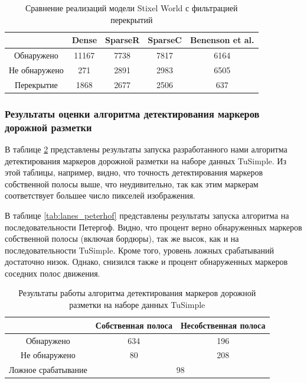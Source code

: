 \documentclass[aps,%
14pt,%
final,%
oneside,
onecolumn,%
musixtex, %
superscriptaddress,%
centertags]{extarticle} %
\begin{document}
\begin{table}
\center
\begin{tabular}{|c|c|c|c|c|}
\hline
						 & Dense & SparseR & SparseC & Benenson et al. \\
\hline
	Обнаружено 			& 11167 & 7738 & 7817 & 6164\\
\hline
	Не обнаружено 		& 271   & 2891 & 2983 & 6505\\
\hline
	Перекрытие			& 1868  & 2677 & 2506 & 637\\
\hline
\end{tabular}
\caption{Сравнение реализаций модели Stixel World с фильтрацией перекрытий}
\label{tab:filter_occ}
\end{table}

\subsubsection{Результаты оценки алгоритма детектирования маркеров дорожной разметки}

В таблице \ref{tab:lanes_tusimple} представлены результаты запуска разработанного нами алгоритма детектирования маркеров дорожной разметки на наборе данных TuSimple. Из этой таблицы, например, видно, что точность детектирования маркеров собственной полосы выше, что неудивительно, так как этим маркерам соответствует большее число пикселей изображения.

В таблице \ref{tab:lanes_peterhof} представлены результаты запуска алгоритма на последовательности Петергоф. Видно, что процент верно обнаруженных маркеров собственной полосы (включая бордюры), так же высок, как и на последовательности TuSimple. Кроме того, уровень ложных срабатываний достаточно низок. Однако, снизился также и процент обнаруженных маркеров соседних полос движения.

\begin{table}[H]
\center
\begin{tabular}{|c|c|c|}
\hline
			& Собственная полоса & Несобственная полоса \\
\hline
	Обнаружено				& 634 & 196\\
\hline
	Не обнаружено			& 80  & 208\\
\hline
	Ложное срабатывание		& \multicolumn{2}{c|}{98}\\
\hline
\end{tabular}
\caption{Результаты работы алгоритма детектирования маркеров дорожной разметки на наборе данных TuSimple}
\label{tab:lanes_tusimple}
\end{table}
\end{document}
